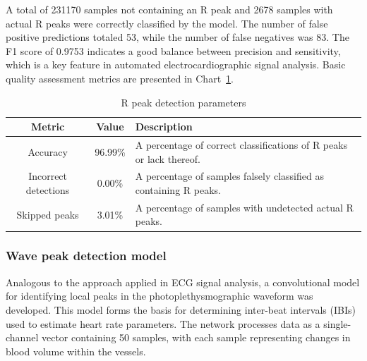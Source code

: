 \documentclass{citask}
\begin{document}
A total of 231170 samples not containing an R peak and 2678 samples with actual R peaks were correctly classified by the model. The number of false positive predictions totaled 53, while the number of false negatives was 83. The F1 score of 0.9753 indicates a good balance between precision and sensitivity, which is a key feature in automated electrocardiographic signal analysis. Basic quality assessment metrics are presented in Chart~\ref{tab:metrics}.

\begin{table}[ht]
\centering
\caption{R peak detection parameters}
\label{tab:metrics}
\begin{tabular}{|c|c|p{4.6cm}|}
\hline
\textbf{Metric} & \textbf{Value} & \textbf{Description} \\
\hline
Accuracy & 96.99\% & A percentage of correct classifications of R peaks or lack thereof. \\
Incorrect detections & 0.00\% & A percentage of samples falsely classified as containing R peaks. \\
Skipped peaks & 3.01\% & A percentage of samples with undetected actual R peaks. \\
\hline
\end{tabular}
\end{table}

\subsubsection{Wave peak detection model}
Analogous to the approach applied in ECG signal analysis, a convolutional model for identifying local peaks in the photoplethysmographic waveform was developed. This model forms the basis for determining inter-beat intervals (IBIs) used to estimate heart rate parameters. The network processes data as a single-channel vector containing 50 samples, with each sample representing changes in blood volume within the vessels.
\end{document}

